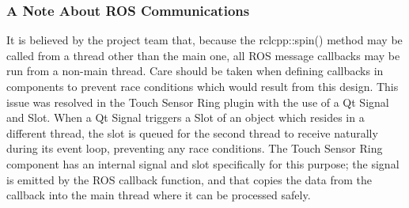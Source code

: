\begin{itemize}
\subsubsection*{A Note About ROS Communications}
It is believed by the project team that, because the rclcpp::spin() method may be called from a thread other than the main one, all ROS message callbacks may be run from a non-main thread. Care should be taken when defining callbacks in components to prevent race conditions which would result from this design. This issue was resolved in the Touch Sensor Ring plugin with the use of a Qt Signal and Slot. When a Qt Signal triggers a Slot of an object which resides in a different thread, the slot is queued for the second thread to receive naturally during its event loop, preventing any race conditions. The Touch Sensor Ring component has an internal signal and slot specifically for this purpose; the signal is emitted by the ROS callback function, and that copies the data from the callback into the main thread where it can be processed safely.

\end{itemize}